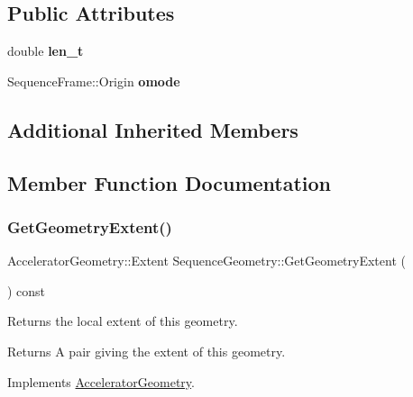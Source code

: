 \subsection*{Public Attributes}
\begin{DoxyCompactItemize}
\item 
\mbox{\label{classSequenceGeometry_a5cca1b02fd7b4e7283ed19f635d242a7}} 
double {\bfseries len\+\_\+t}
\item 
\mbox{\label{classSequenceGeometry_a561c6e1ecfd40afd6e0bc2fa72194974}} 
Sequence\+Frame\+::\+Origin {\bfseries omode}
\end{DoxyCompactItemize}
\subsection*{Additional Inherited Members}


\subsection{Member Function Documentation}
\mbox{\label{classSequenceGeometry_a1d904b73570a03e3496dbbd574b8fde0}} 
\subsubsection{\texorpdfstring{Get\+Geometry\+Extent()}{GetGeometryExtent()}}
{\footnotesize\ttfamily Accelerator\+Geometry\+::\+Extent Sequence\+Geometry\+::\+Get\+Geometry\+Extent (\begin{DoxyParamCaption}{ }\end{DoxyParamCaption}) const\hspace{0.3cm}{\ttfamily [virtual]}}

Returns the local extent of this geometry. \begin{DoxyReturn}{Returns}
A pair giving the extent of this geometry. 
\end{DoxyReturn}


Implements \hyperlink{classAcceleratorGeometry_a2db830fe927af3c9cba59b8452370bfb}{Accelerator\+Geometry}.

\mbox{\label{classSequenceGeometry_a322e113ebda69e6c42af9415f3c964d9}} 

